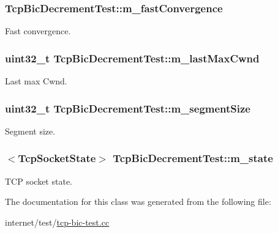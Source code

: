 \subsubsection[{\texorpdfstring{m\+\_\+fast\+Convergence}{m_fastConvergence}}]{ Tcp\+Bic\+Decrement\+Test\+::m\+\_\+fast\+Convergence\hspace{0.3cm}{\ttfamily [private]}}\hypertarget{classTcpBicDecrementTest_ab7843c294958bc856516bd2713edce99}{}\label{classTcpBicDecrementTest_ab7843c294958bc856516bd2713edce99}


Fast convergence. 

\subsubsection[{\texorpdfstring{m\+\_\+last\+Max\+Cwnd}{m_lastMaxCwnd}}]{\setlength{\rightskip}{0pt plus 5cm}uint32\+\_\+t Tcp\+Bic\+Decrement\+Test\+::m\+\_\+last\+Max\+Cwnd\hspace{0.3cm}{\ttfamily [private]}}\hypertarget{classTcpBicDecrementTest_a821e60a1b65ae88f0659eaa45225ca1b}{}\label{classTcpBicDecrementTest_a821e60a1b65ae88f0659eaa45225ca1b}


Last max Cwnd. 

\subsubsection[{\texorpdfstring{m\+\_\+segment\+Size}{m_segmentSize}}]{\setlength{\rightskip}{0pt plus 5cm}uint32\+\_\+t Tcp\+Bic\+Decrement\+Test\+::m\+\_\+segment\+Size\hspace{0.3cm}{\ttfamily [private]}}\hypertarget{classTcpBicDecrementTest_a6430400f92d1bcb3832692cdb4936475}{}\label{classTcpBicDecrementTest_a6430400f92d1bcb3832692cdb4936475}


Segment size. 

\subsubsection[{\texorpdfstring{m\+\_\+state}{m_state}}]{$<${\bf Tcp\+Socket\+State}$>$ Tcp\+Bic\+Decrement\+Test\+::m\+\_\+state\hspace{0.3cm}{\ttfamily [private]}}\hypertarget{classTcpBicDecrementTest_a917e5a2c5da454fc06ee7d5be6814d47}{}\label{classTcpBicDecrementTest_a917e5a2c5da454fc06ee7d5be6814d47}


T\+CP socket state. 



The documentation for this class was generated from the following file\+:\begin{DoxyCompactItemize}
\item 
internet/test/\hyperlink{tcp-bic-test_8cc}{tcp-\/bic-\/test.\+cc}\end{DoxyCompactItemize}
